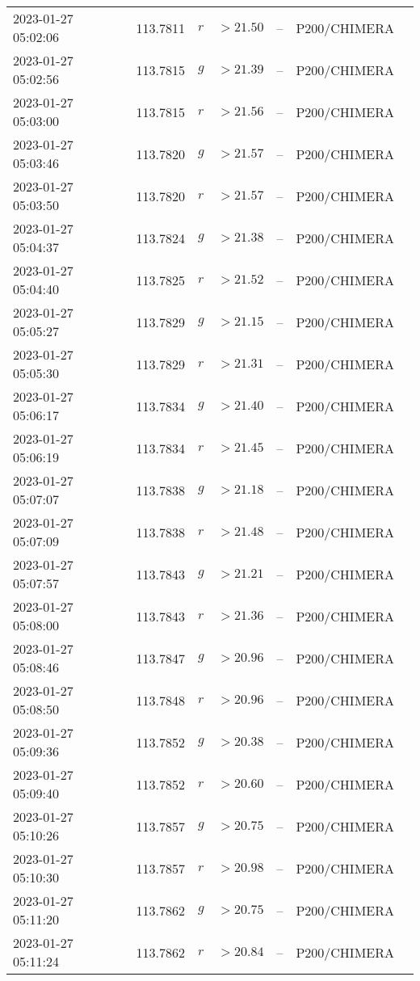 \documentclass{nature_plusfigure}
\begin{document}
\begin{supplement}
\begin{center}
\begin{longtable}{lllllll}
2023-01-27 05:02:06 & 113.7811 & $r$ & $>21.50$ & -- & P200/CHIMERA &  \\ 
2023-01-27 05:02:56 & 113.7815 & $g$ & $>21.39$ & -- & P200/CHIMERA &  \\ 
2023-01-27 05:03:00 & 113.7815 & $r$ & $>21.56$ & -- & P200/CHIMERA &  \\ 
2023-01-27 05:03:46 & 113.7820 & $g$ & $>21.57$ & -- & P200/CHIMERA &  \\ 
2023-01-27 05:03:50 & 113.7820 & $r$ & $>21.57$ & -- & P200/CHIMERA &  \\ 
2023-01-27 05:04:37 & 113.7824 & $g$ & $>21.38$ & -- & P200/CHIMERA &  \\ 
2023-01-27 05:04:40 & 113.7825 & $r$ & $>21.52$ & -- & P200/CHIMERA &  \\ 
2023-01-27 05:05:27 & 113.7829 & $g$ & $>21.15$ & -- & P200/CHIMERA &  \\ 
2023-01-27 05:05:30 & 113.7829 & $r$ & $>21.31$ & -- & P200/CHIMERA &  \\ 
2023-01-27 05:06:17 & 113.7834 & $g$ & $>21.40$ & -- & P200/CHIMERA &  \\ 
2023-01-27 05:06:19 & 113.7834 & $r$ & $>21.45$ & -- & P200/CHIMERA &  \\ 
2023-01-27 05:07:07 & 113.7838 & $g$ & $>21.18$ & -- & P200/CHIMERA &  \\ 
2023-01-27 05:07:09 & 113.7838 & $r$ & $>21.48$ & -- & P200/CHIMERA &  \\ 
2023-01-27 05:07:57 & 113.7843 & $g$ & $>21.21$ & -- & P200/CHIMERA &  \\ 
2023-01-27 05:08:00 & 113.7843 & $r$ & $>21.36$ & -- & P200/CHIMERA &  \\ 
2023-01-27 05:08:46 & 113.7847 & $g$ & $>20.96$ & -- & P200/CHIMERA &  \\ 
2023-01-27 05:08:50 & 113.7848 & $r$ & $>20.96$ & -- & P200/CHIMERA &  \\ 
2023-01-27 05:09:36 & 113.7852 & $g$ & $>20.38$ & -- & P200/CHIMERA &  \\ 
2023-01-27 05:09:40 & 113.7852 & $r$ & $>20.60$ & -- & P200/CHIMERA &  \\ 
2023-01-27 05:10:26 & 113.7857 & $g$ & $>20.75$ & -- & P200/CHIMERA &  \\ 
2023-01-27 05:10:30 & 113.7857 & $r$ & $>20.98$ & -- & P200/CHIMERA &  \\ 
2023-01-27 05:11:20 & 113.7862 & $g$ & $>20.75$ & -- & P200/CHIMERA &  \\ 
2023-01-27 05:11:24 & 113.7862 & $r$ & $>20.84$ & -- & P200/CHIMERA &  \\ 

\end{longtable}
\end{center}
\end{supplement}
\end{document}
